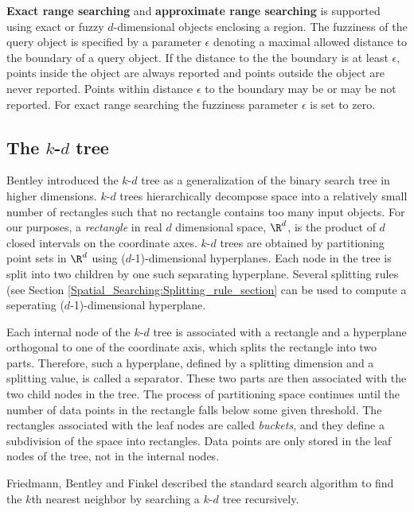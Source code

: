 {\bf Exact range searching}
and 
{\bf approximate range searching} is supported using exact or fuzzy $d$-dimensional objects enclosing a region.
The fuzziness of the query object 
is specified by a parameter $\epsilon$ denoting
a maximal allowed distance to the boundary of a query object.  
If the distance to the the boundary is at
least $\epsilon$,
points inside the object
are always reported and 
points outside the object are never reported. Points within distance $\epsilon$ to the 
boundary may be or may be not reported.  For exact range searching 
the fuzziness parameter $\epsilon$ is set to zero.

\subsection{The $k$-$d$ tree}
\label{Kd_tree_section}

Bentley \cite{b-mbstu-75} introduced the $k$-$d$ tree as a generalization of the binary
search tree in higher dimensions. $k$-$d$ trees hierarchically decompose space into a
relatively small number of rectangles such that no rectangle contains too many input objects.
For our purposes, a {\it rectangle} in real $d$ dimensional space, $\R^d$, is the product of $d$ closed
intervals on the coordinate axes.
$k$-$d$ trees are obtained by partitioning point sets in $\R^d$ using
($d$-1)-dimensional hyperplanes.
Each node in the tree is split into two children by one such separating hyperplane.
Several splitting rules (see Section \ref{Spatial_Searching:Splitting_rule_section}
can be used to compute a seperating ($d$-1)-dimensional hyperplane.

Each internal node of the $k$-$d$ tree is associated with a rectangle
and a hyperplane orthogonal to
one of the coordinate axis, which splits the rectangle into two parts.
Therefore, such a hyperplane, defined by a splitting dimension
and a splitting value, is called a separator.
These two parts are then associated
with the two child nodes in the tree. The process of partitioning space continues until the number of data
points in the rectangle falls below some given threshold. The rectangles associated with the leaf nodes
are called {\it buckets}, and they define a subdivision of the space into rectangles.
Data points are only stored in the leaf nodes of the tree, not in the internal nodes.

Friedmann, Bentley and Finkel \cite{fbf-afbml-77} described the standard
search algorithm to find the $k$th nearest neighbor by searching a $k$-$d$ tree recursively.

